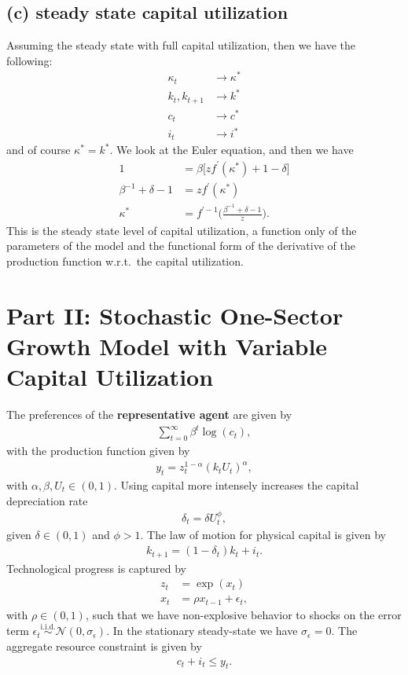 \documentclass[a4paper]{article}
\theoremstyle{definition}
\begin{document}
\subsection{(c) steady state capital utilization}
Assuming the steady state with full capital utilization, then we have the following:
	\begin{align*}
	\kappa_t 					&\rightarrow \kappa^* \\
	k_t ,k_{t+1}				&\rightarrow k^* \\
	c_t 						&\rightarrow c^* \\
	i_t 							&\rightarrow i^* 
	\end{align*}
and of course $\kappa^* = k^*$. We look at the Euler equation, and then we have
	\begin{align*}
	1 							&= \beta \big[ z f^\prime(\kappa^*)+1-\delta \big] \\
	\beta^{-1} +\delta-1	&= z f^\prime (\kappa^*) \\
	\kappa^* 				&= f^{\prime -1} \Big( \frac{\beta^{-1} + \delta - 1}{z} \Big).
	\end{align*}	
This is the steady state level of capital utilization, a function only of the parameters of the model and the functional form of the derivative of the production function w.r.t.\ the capital utilization.	
%
%
%
%
%
%
%
%
%
%
%
%
%
\newpage
\section{Part II: Stochastic One-Sector Growth Model with Variable Capital Utilization}
The preferences of the \textbf{representative agent} are given by
	\begin{align*}
	\sum\limits_{t=0}^{\infty} \beta^t \log(c_t) ,
	\end{align*} 
with the production function given by
	\begin{align*}
	y_t = z_t^{1-\alpha}(k_t U_t)^\alpha,
	\end{align*}	
with $\alpha,\beta,U_t \in (0,1)$. Using capital more intensely increases the capital depreciation rate
	\begin{align*}
	\delta_t = \delta U_t^\phi,
	\end{align*}	
given $\delta \in (0,1)$ and $\phi > 1$. The law of motion for physical capital is given by
	\begin{align*}
	k_{t+1} = (1-\delta_t)k_t + i_t.
	\end{align*}	
Technological progress is captured by
	\begin{align*}
	z_t 	&= \exp (x_t) \\
	x_t 	&= \rho x_{t-1} + \epsilon_t,
	\end{align*}	
with $\rho \in (0,1)$, such that we have non-explosive behavior to shocks on the error term $\epsilon_t \overset{\text{i.i.d.}}{\sim} \mathcal N(0,\sigma_\epsilon)$. In the stationary steady-state we have $\sigma_\epsilon = 0$. The aggregate resource constraint is given by
	\begin{align*}
	c_t + i_t \leq y_t.
	\end{align*}
\end{document}

